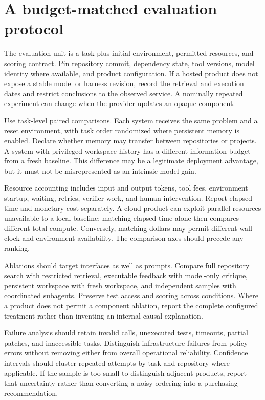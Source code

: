 \section{A budget-matched evaluation protocol}\label{sec:C23:experiments}
The evaluation unit is a task plus initial environment, permitted resources, and scoring contract. Pin repository commit, dependency state, tool versions, model identity where available, and product configuration. If a hosted product does not expose a stable model or harness revision, record the retrieval and execution dates and restrict conclusions to the observed service. A nominally repeated experiment can change when the provider updates an opaque component.

Use task-level paired comparisons. Each system receives the same problem and a reset environment, with task order randomized where persistent memory is enabled. Declare whether memory may transfer between repositories or projects. A system with privileged workspace history has a different information budget from a fresh baseline. This difference may be a legitimate deployment advantage, but it must not be misrepresented as an intrinsic model gain.

Resource accounting includes input and output tokens, tool fees, environment startup, waiting, retries, verifier work, and human intervention. Report elapsed time and monetary cost separately. A cloud product can exploit parallel resources unavailable to a local baseline; matching elapsed time alone then compares different total compute. Conversely, matching dollars may permit different wall-clock and environment availability. The comparison axes should precede any ranking.

Ablations should target interfaces as well as prompts. Compare full repository search with restricted retrieval, executable feedback with model-only critique, persistent workspace with fresh workspace, and independent samples with coordinated subagents. Preserve test access and scoring across conditions. Where a product does not permit a component ablation, report the complete configured treatment rather than inventing an internal causal explanation.

Failure analysis should retain invalid calls, unexecuted tests, timeouts, partial patches, and inaccessible tasks. Distinguish infrastructure failures from policy errors without removing either from overall operational reliability. Confidence intervals should cluster repeated attempts by task and repository where applicable. If the sample is too small to distinguish adjacent products, report that uncertainty rather than converting a noisy ordering into a purchasing recommendation.

